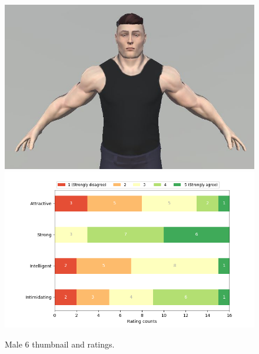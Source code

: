 \begin{figure}[H]
  \includegraphics[width=\linewidth]{Images/Males/6.JPG}
\endminipage\hfill
{}
  \includegraphics[width=\linewidth]{Survey/MRatings/avatar_m6.png}
\endminipage\hfill
\caption{Male 6 thumbnail and ratings.}
\end{figure}

